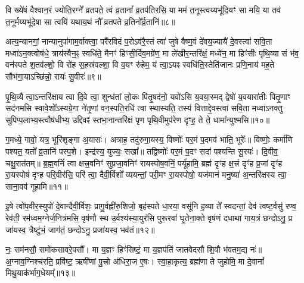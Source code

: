 वि ख्ये॑षं वैश्वान॒रं ज्योति॒रग्ने᳚ व्रतपते॒ त्वं व्र॒तानां᳚ व्र॒तप॑तिरसि॒ या मम॑ त॒नूस्त्वय्यभू॑दि॒यꣳ सा मयि॒ या तव॑ त॒नूर्मय्यभू॑दे॒षा सा त्वयि॑ यथाय॒थं नौ᳚ व्रतपते व्र॒तिनो᳚र्व्र॒तानि॑॥८॥

{\anuvakamend[{गा॒तु॒विद॒भ्येक॑त्रिꣳशच्च॥४॥}]}

अत्य॒न्यानगां॒ नान्यानुपा॑गाम॒र्वाक्त्वा॒ परै॑रविदं प॒रो\-ऽव॑रै॒स्तं त्वा॑ जुषे वैष्ण॒वं दे॑वय॒ज्यायै॑ दे॒वस्त्वा॑ सवि॒ता मध्वा॑\-ऽन॒क्त्वोष॑धे॒ त्राय॑स्वैन॒ꣴ॒ स्वधि॑ते॒ मैनꣳ॑ हिꣳसी॒र्दिव॒मग्रे॑ण॒ मा ले॑खीर॒न्तरि॑क्षं॒ मध्ये॑न॒ मा हिꣳ॑सीः पृथि॒व्या सं भ॑व॒ वन॑स्पते श॒तव॑ल्\mbox{}शो॒ वि रो॑ह स॒हस्र॑वल्\mbox{}शा॒ वि व॒यꣳ रु॑हेम॒ यं त्वा॒\-ऽयꣴ स्वधि॑ति॒स्तेति॑जानः प्रणि॒नाय॑ मह॒ते सौभ॑गा॒या\-ऽच्छि॑न्नो॒ रायः॑ सु॒वीरः॑॥९॥

{\anuvakamend[{यं दश॑ च॥५॥}]}

पृ॒थि॒व्यै त्वा॒\-ऽन्तरि॑क्षाय त्वा दि॒वे त्वा॒ शुन्ध॑तां लो॒कः पि॑तृ॒षद॑नो॒ यवो॑\-ऽसि य॒वया॒स्मद् द्वेषो॑ य॒वयारा॑तीः पितृ॒णाꣳ सद॑नमसि स्वावे॒शो᳚\-ऽस्यग्रे॒गा ने॑तृ॒णां वन॒स्पति॒रधि॑ त्वा स्थास्यति॒ तस्य॑ वित्ताद्दे॒वस्त्वा॑ सवि॒ता मध्वा॑\-ऽनक्तु सुपिप्प॒लाभ्य॒स्त्वौष॑धीभ्य॒ उद्दिवꣴ॑ स्तभा॒नान्तरि॑क्षं पृण पृथि॒वीमुप॑रेण दृꣳह॒ ते ते॒ धामा᳚न्युश्मसि॥१०॥

ग॒मध्ये॒ गावो॒ यत्र॒ भूरि॑शृङ्गा अ॒यासः॑। अत्राह॒ तदु॑रुगा॒यस्य॒ विष्णोः᳚ पर॒मं प॒दमव॑ भाति॒ भूरेः᳚॥ विष्णोः॒ कर्मा॑णि पश्यत॒ यतो᳚ व्र॒तानि॑ पस्प॒शे। इन्द्र॑स्य॒ युज्यः॒ सखा᳚॥ तद्विष्णोः᳚ पर॒मं प॒दꣳ सदा॑ पश्यन्ति सू॒रयः॑। दि॒वीव॒ चक्षु॒रात॑तम्॥ ब्र॒ह्म॒वनिं॑ त्वा क्षत्त्र॒वनिꣳ॑ सुप्रजा॒वनिꣳ॑ रायस्पोष॒वनिं॒ पर्यू॑हामि॒ ब्रह्म॑ दृꣳह क्ष॒त्त्रं दृꣳ॑ह प्र॒जां दृꣳ॑ह रा॒यस्पोषं॑ दृꣳह परि॒वीर॑सि॒ परि॑ त्वा॒ दैवी॒र्विशो᳚ व्ययन्तां॒ परी॒मꣳ रा॒यस्पोषो॒ यज॑मानं मनु॒ष्या॑ अ॒न्तरि॑क्षस्य त्वा॒ साना॒वव॑ गूहामि॥११॥

{\anuvakamend[{उ॒श्म॒सी॒ पोष॒मेका॒न्नविꣳ॑श॒तिश्च॑॥६॥}]}

इ॒षे त्वो॑प॒वीर॒स्युपो॑ दे॒वान्दैवी॒र्विशः॒ प्रागु॒र्वह्नी॑रु॒शिजो॒ बृह॑स्पते धा॒रया॒ वसू॑नि ह॒व्या ते᳚ स्वदन्तां॒ देव॑ त्वष्ट॒र्वसु॑ रण्व॒ रेव॑ती॒ रम॑ध्वम॒ग्नेर्ज॒नित्र॑मसि॒ वृष॑णौ स्थ उ॒र्वश्य॑स्या॒युर॑सि पुरू॒रवा॑ घृ॒तेना॒क्ते वृष॑णं दधाथां गाय॒त्रं छन्दो\-ऽनु॒ प्र जा॑यस्व॒ त्रैष्टु॑भं॒ जाग॑तं॒ छन्दो\-ऽनु॒ प्रजा॑यस्व॒ भव॑तं॥१२॥

नः॒ सम॑नसौ॒ समो॑कसावरे॒पसौ᳚। मा य॒ज्ञꣳ हिꣳ॑सिष्टं॒ मा य॒ज्ञप॑तिं जातवेदसौ शि॒वौ भ॑वतम॒द्य नः॑॥ अ॒ग्नाव॒ग्निश्च॑रति॒ प्रवि॑ष्ट॒ ऋषी॑णां पु॒त्त्रो अ॑धिरा॒ज ए॒षः। स्वा॒हा॒कृत्य॒ ब्रह्म॑णा ते जुहोमि॒ मा दे॒वानां᳚ मिथु॒याक॑र्भाग॒धेयम्᳚॥१३॥


